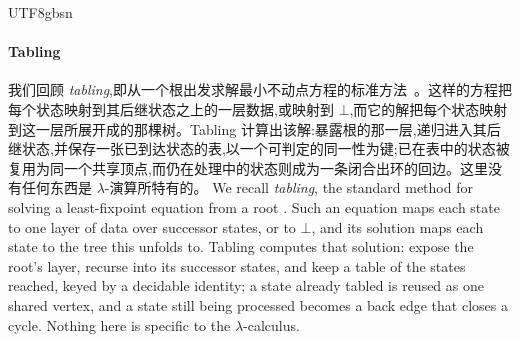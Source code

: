 \begin{CJK*}{UTF8}{gbsn}
  \paragraph{Tabling}
  \ifTablambdaChinese
  我们回顾 \emph{tabling},即从一个根出发求解最小不动点方程的标准方法~\cite{tamaki1986-tabled-resolution, chen1996-tabled-evaluation-delaying, vanemden1976-predicate-logic-semantics}。这样的方程把每个状态映射到其后继状态之上的一层数据,或映射到 $\bot$,而它的解把每个状态映射到这一层所展开成的那棵树。Tabling 计算出该解:暴露根的那一层,递归进入其后继状态,并保存一张已到达状态的表,以一个可判定的同一性为键;已在表中的状态被复用为同一个共享顶点,而仍在处理中的状态则成为一条闭合出环的回边。这里没有任何东西是 $\lambda$-演算所特有的。
  \else
  We recall \emph{tabling}, the standard method for solving a least-fixpoint equation from a root \cite{tamaki1986-tabled-resolution, chen1996-tabled-evaluation-delaying, vanemden1976-predicate-logic-semantics}. Such an equation maps each state to one layer of data over successor states, or to $\bot$, and its solution maps each state to the tree this unfolds to. Tabling computes that solution: expose the root's layer, recurse into its successor states, and keep a table of the states reached, keyed by a decidable identity; a state already tabled is reused as one shared vertex, and a state still being processed becomes a back edge that closes a cycle. Nothing here is specific to the $\lambda$-calculus.
  \fi


\end{CJK*}
